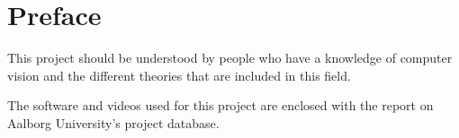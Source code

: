 \section*{Preface}
This project should be understood by people who have a knowledge of computer vision and the different theories that are included in this field.

The software and videos used for this project are enclosed with the report on Aalborg University's project database.


